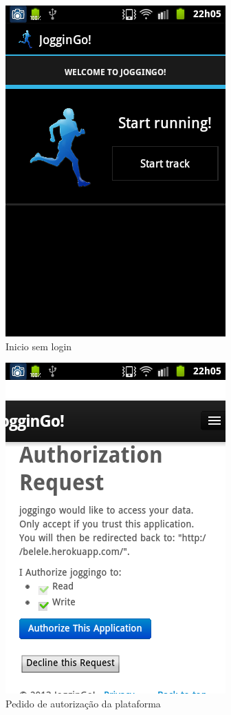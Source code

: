 \documentclass[15pt,a4paper]{article}
\begin{document}
\begin{figure}[htp]
  \centering
  \includegraphics[scale=0.5]{android_1.png}
  \caption{Inicio sem login}
\end{figure}


\begin{figure}[htp]
  \centering
  \includegraphics[scale=0.5]{android_2.png}
  \caption{Pedido de autorização da plataforma}
\end{figure}
\end{document}
